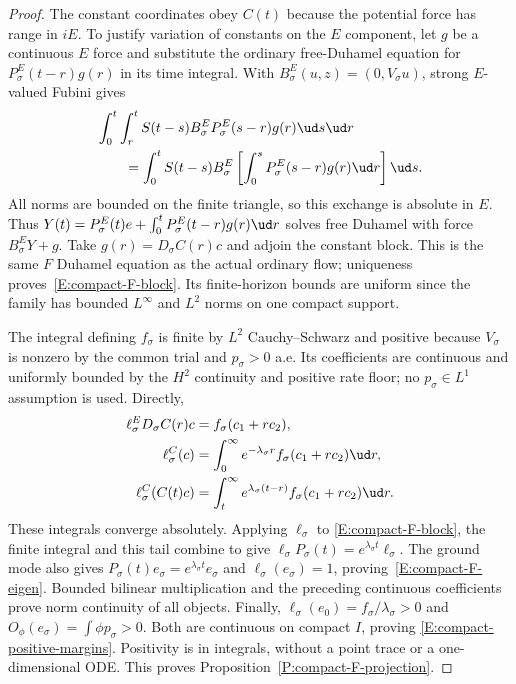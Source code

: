 \begin{proof}
  The constant coordinates obey $C(t)$ because the potential force
  has range in $iE$. To justify variation of constants on the $E$
  component, let $g$ be a continuous $E$ force and substitute the
  ordinary free-Duhamel equation for $P_\sigma^E(t-r)g(r)$ in its
  time integral. With $B_\sigma^E(u,z)=(0,V_\sigma u)$, strong
  $E$-valued Fubini gives
  \begin{align*}
    &\int_0^t\int_r^t S(t-s)B_\sigma^E
    P_\sigma^E(s-r)g(r)\ud s\ud r\\
    &\qquad=\int_0^tS(t-s)B_\sigma^E
    \left[\int_0^sP_\sigma^E(s-r)g(r)\ud r\right]\ud s.
  \end{align*}
  All norms are bounded on the finite triangle, so this exchange is
  absolute in $E$. Thus
  $Y(t)=P_\sigma^E(t)e+\int_0^tP_\sigma^E(t-r)g(r)\ud r$
  solves free Duhamel with force $B_\sigma^EY+g$.
  Take $g(r)=D_\sigma C(r)c$ and adjoin the constant block.
  This is the same $F$ Duhamel equation as the actual ordinary flow;
  uniqueness proves~\eqref{E:compact-F-block}.
  Its finite-horizon bounds are uniform since the family has bounded
  $L^\infty$ and $L^2$ norms on one compact support.

  The integral defining $f_\sigma$ is finite by $L^2$
  Cauchy--Schwarz and positive because $V_\sigma$ is nonzero by
  the common trial and $p_\sigma>0$ a.e. Its coefficients are
  continuous and uniformly bounded by the $H^2$ continuity and
  positive rate floor; no $p_\sigma\in L^1$ assumption is used.
  Directly,
  \begin{align*}
    \ell_\sigma^ED_\sigma C(r)c&=f_\sigma(c_1+rc_2),\\
    \ell_\sigma^C(c)
    &=\int_0^\infty e^{-\lambda_\sigma r}
    f_\sigma(c_1+rc_2)\ud r,\\
    \ell_\sigma^C(C(t)c)
    &=\int_t^\infty e^{\lambda_\sigma(t-r)}
    f_\sigma(c_1+rc_2)\ud r.
  \end{align*}
  These integrals converge absolutely. Applying $\ell_\sigma$ to
  \eqref{E:compact-F-block}, the finite integral and this tail
  combine to give
  $\ell_\sigma P_\sigma(t)=e^{\lambda_\sigma t}\ell_\sigma$.
  The ground mode also gives
  $P_\sigma(t)e_\sigma=e^{\lambda_\sigma t}e_\sigma$ and
  $\ell_\sigma(e_\sigma)=1$, proving~\eqref{E:compact-F-eigen}.
  Bounded bilinear multiplication and the preceding continuous
  coefficients prove norm continuity of all objects.
  Finally,
  $\ell_\sigma(e_0)=f_\sigma/\lambda_\sigma>0$ and
  $O_\phi(e_\sigma)=\int\phi p_\sigma>0$.
  Both are continuous on compact $I$, proving
  \eqref{E:compact-positive-margins}. Positivity is in integrals,
  without a point trace or a one-dimensional ODE.
  This proves Proposition~\ref{P:compact-F-projection}.
\end{proof}

